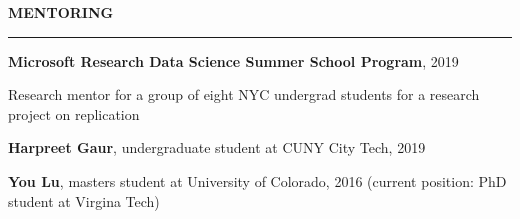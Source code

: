 \documentclass[11pt,letterpaper]{article}
\newcommand{\cvsection}[1]{%
  \Needspace{8\baselineskip}%
  \vspace{1.25em}%
  {\large\bfseries\color{navy}\MakeUppercase{#1}}\par
  \vspace{0.16em}%
  {\color{accentblue}\rule{\textwidth}{1.1pt}}\par
  \vspace{0.55em}%
}
\begin{document}
\cvsection{Mentoring}

\textbf{\color{navy}Microsoft Research Data Science Summer School Program}, 2019\par
Research mentor for a group of eight NYC undergrad students for a research project on replication\par
\vspace{0.7em}
\textbf{\color{navy}Harpreet Gaur}, undergraduate student at CUNY City Tech, 2019\par
\vspace{0.7em}
\textbf{\color{navy}You Lu}, masters student at University of Colorado, 2016 (current position: PhD student at Virgina Tech)
\fi
\end{document}

